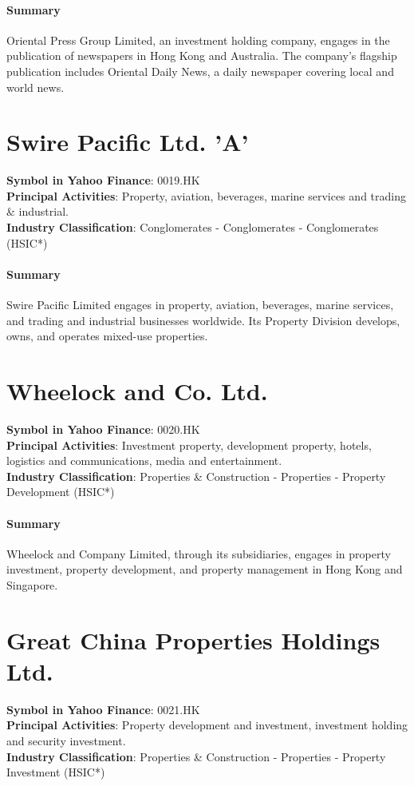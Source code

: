 \paragraph{Summary}
Oriental Press Group Limited, an investment holding company, engages in the publication of newspapers in Hong Kong and Australia. The company's flagship publication includes Oriental Daily News, a daily newspaper covering local and world news.


\section{Swire Pacific Ltd. 'A'}
\textbf{Symbol in Yahoo Finance}: 0019.HK\\
\textbf{Principal Activities}: Property, aviation, beverages, marine services and trading \& industrial.\\
\textbf{Industry Classification}: Conglomerates - Conglomerates - Conglomerates (HSIC*)
\paragraph{Summary}
Swire Pacific Limited engages in property, aviation, beverages, marine services, and trading and industrial businesses worldwide. Its Property Division develops, owns, and operates mixed-use properties.


\section{Wheelock and Co. Ltd.}
\textbf{Symbol in Yahoo Finance}: 0020.HK\\
\textbf{Principal Activities}: Investment property, development property, hotels, logistics and communications, media and entertainment.\\
\textbf{Industry Classification}: Properties \& Construction - Properties - Property Development (HSIC*)
\paragraph{Summary}
Wheelock and Company Limited, through its subsidiaries, engages in property investment, property development, and property management in Hong Kong and Singapore.


\section{Great China Properties Holdings Ltd.}
\textbf{Symbol in Yahoo Finance}: 0021.HK\\
\textbf{Principal Activities}: Property development and investment, investment holding and security investment.\\
\textbf{Industry Classification}: Properties \& Construction - Properties - Property Investment (HSIC*)
